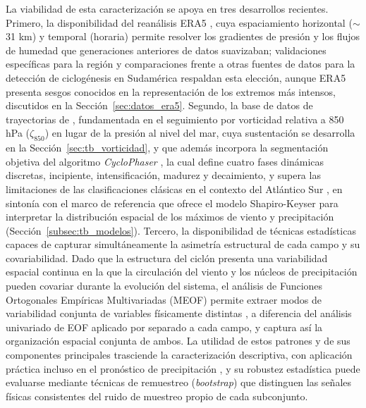 La viabilidad de esta caracterización se apoya en tres desarrollos recientes.
Primero, la disponibilidad del reanálisis ERA5 \citep{hersbach2020era5}, cuya espaciamiento horizontal ($\sim$31 km) y temporal (horaria) permite resolver los gradientes de presión y los flujos de humedad que generaciones anteriores de datos suavizaban; validaciones específicas para la región \citep{gramcianinov2020analysis} y comparaciones frente a otras fuentes de datos para la detección de ciclogénesis en Sudamérica \citep{dalanhese2023new} respaldan esta elección, aunque ERA5 presenta sesgos conocidos en la representación de los extremos más intensos, discutidos en la Sección~\ref{sec:datos_era5}.
Segundo, la base de datos de trayectorias de \citet{gramcianinov2020analysis}, fundamentada en el seguimiento por vorticidad relativa a 850 hPa ($\zeta_{850}$) en lugar de la presión al nivel del mar, cuya sustentación se desarrolla en la Sección~\ref{sec:tb_vorticidad}, y que además incorpora la segmentación objetiva del algoritmo \textit{CycloPhaser} \citep{coutodesouza2024new, deSouza2025CycloPhaser}, la cual define cuatro fases dinámicas discretas, incipiente, intensificación, madurez y decaimiento, y supera las limitaciones de las clasificaciones clásicas en el contexto del Atlántico Sur \citep{deSouza2025CycloPhaser}, en sintonía con el marco de referencia que ofrece el modelo Shapiro-Keyser \citep{shapiro1990life,shapiro1999bridge} para interpretar la distribución espacial de los máximos de viento y precipitación (Sección~\ref{subsec:tb_modelos}).
Tercero, la disponibilidad de técnicas estadísticas capaces de capturar simultáneamente la asimetría estructural de cada campo y su covariabilidad. 
Dado que la estructura del ciclón presenta una variabilidad espacial continua en la que la circulación del viento y los núcleos de precipitación pueden covariar durante la evolución del sistema, el análisis de Funciones Ortogonales Empíricas Multivariadas (MEOF) permite extraer modos de variabilidad conjunta de variables físicamente distintas \citep{liang2018multivariate}, a diferencia del análisis univariado de EOF aplicado por separado a cada campo, y captura así la organización espacial conjunta de ambos.
La utilidad de estos patrones y de sus componentes principales trasciende la caracterización descriptiva, con aplicación práctica incluso en el pronóstico de precipitación \citep{sun2022evaluation}, y su robustez estadística puede evaluarse mediante técnicas de remuestreo (\textit{bootstrap}) que distinguen las señales físicas consistentes del ruido de muestreo propio de cada subconjunto.

